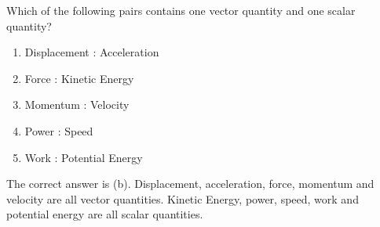 
\begin{problem} 
{Which of the following pairs contains one vector quantity and one scalar quantity?
\begin{enumerate}
	\item Displacement \quad : \quad Acceleration
	\item Force \quad : \quad Kinetic Energy \answer
	\item Momentum \quad : \quad Velocity
	\item Power \quad : \quad Speed
	\item Work \quad : \quad Potential Energy
\end{enumerate}
}
{}
{The correct answer is (b). Displacement, acceleration, force, momentum and velocity are all vector quantities. Kinetic Energy, power, speed, work and potential energy are all scalar quantities.}
\end{problem}